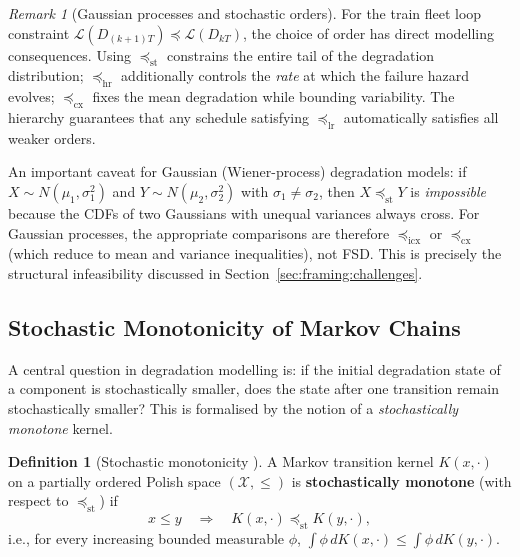 \documentclass[11pt,a4paper]{article}
\theoremstyle{plain}
\theoremstyle{definition}
\newtheorem{definition}[theorem]{Definition}
\theoremstyle{remark}
\newtheorem{remark}[theorem]{Remark}
\begin{document}
\begin{remark}[Gaussian processes and stochastic orders]
\label{rem:gaussian_orders}
For the train fleet loop constraint
$\mathcal{L}(D_{(k+1)T}) \preceq \mathcal{L}(D_{kT})$,
the choice of order has direct modelling consequences.
Using $\preceq_{\mathrm{st}}$ constrains the entire tail of the degradation distribution;
$\preceq_{\mathrm{hr}}$ additionally controls the \emph{rate} at which the failure hazard
evolves; $\preceq_{\mathrm{cx}}$ fixes the mean degradation while bounding variability.
The hierarchy guarantees that any schedule satisfying $\preceq_{\mathrm{lr}}$ automatically
satisfies all weaker orders.

An important caveat for Gaussian (Wiener-process) degradation models: if
$X \sim N(\mu_1, \sigma_1^2)$ and $Y \sim N(\mu_2, \sigma_2^2)$ with
$\sigma_1 \neq \sigma_2$, then $X \preceq_{\mathrm{st}} Y$ is \emph{impossible}
because the CDFs of two Gaussians with unequal variances always cross.
For Gaussian processes, the appropriate comparisons are therefore
$\preceq_{\mathrm{icx}}$ or $\preceq_{\mathrm{cx}}$ (which reduce to mean and
variance inequalities), not FSD.  This is precisely the structural infeasibility
discussed in Section~\ref{sec:framing:challenges}.
\end{remark}

\subsection{Stochastic Monotonicity of Markov Chains}
\label{sec:micro:monotone}

A central question in degradation modelling is: if the initial degradation state of a
component is stochastically smaller, does the state after one transition remain
stochastically smaller?  This is formalised by the notion of a
\emph{stochastically monotone} kernel.


\begin{definition}[Stochastic monotonicity {\cite{daley1968}}]
\label{def:stoch_mono}
A Markov transition kernel $K(x, \cdot)$ on a partially ordered Polish space
$(\mathcal{X}, \leq)$ is \textbf{stochastically monotone} (with respect to
$\preceq_{\mathrm{st}}$) if
\begin{equation}
  x \leq y \quad\Longrightarrow\quad K(x, \cdot) \preceq_{\mathrm{st}} K(y, \cdot),
  \label{eq:stoch_mono}
\end{equation}
i.e., for every increasing bounded measurable $\phi$,
$\int \phi\, dK(x,\cdot) \leq \int \phi\, dK(y,\cdot)$.
\end{definition}
\end{document}
